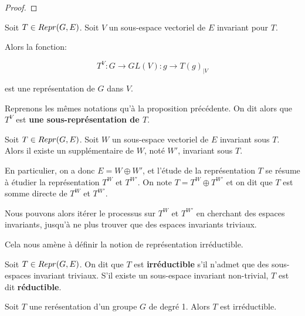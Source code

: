 \ifdefined\outputproof
\begin{proof}

\end{proof}
\fi

\begin{proposition}
	Soit $T \in Repr(G, E)$. Soit $V$ un sous-espace vectoriel de $E$
	invariant pour $T$.

	Alors la fonction:

	\begin{equation}
		T^{V} : G \rightarrow GL(V) : g \rightarrow T(g)_{|V}
	\end{equation}

	est une représentation de $G$ dans $V$.
\end{proposition}

\begin{definition}
	Reprenons les mêmes notations qu'à la proposition précédente.
	On dit alors que $T^{V}$ est \textbf{une sous-représentation de $T$}.
\end{definition}

\begin{proposition}
	Soit $T \in Repr(G, E)$. Soit $W$ un sous-espace vectoriel de $E$
	invariant sous $T$. Alors il existe un supplémentaire de $W$, noté $W'$,
	invariant sous $T$.
\end{proposition}

En particulier, on a donc $E = W \oplus W'$, et l'étude de la représentation $T$
se résume à étudier la représentation $T^{W}$ et $T^{W'}$. On note $T = T^{W}
\oplus T^{W'}$ et on dit que $T$ est somme directe de $T^{W}$ et $T^{W'}$.

Nous pouvons alors itérer le processus sur $T^{W}$ et $T^{W'}$ en cherchant des
espaces invariants, jusqu'à ne plus trouver que des espaces invariants triviaux.

Cela nous amène à définir la notion de représentation irréductible.

\begin{definition} 
	Soit $T \in Repr(G, E)$. On dit que $T$ est \textbf{irréductible} s'il
	n'admet que des sous-espaces invariant triviaux. S'il existe un sous-espace
	invariant non-trivial, $T$ est dit \textbf{réductible}.
\end{definition}

\begin{exercice}
	Soit $T$ une rerésentation d'un groupe $G$ de degré 1. Alors $T$ est
	irréductible.
\end{exercice}

